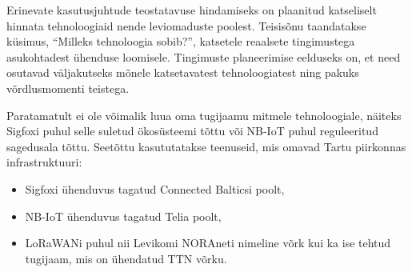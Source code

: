 \documentclass[12pt]{article}
\begin{document}
    Erinevate kasutusjuhtude teostatavuse hindamiseks on plaanitud katseliselt hinnata tehnoloogiaid nende leviomaduste poolest.
    Teisisõnu taandatakse küsimus, "`Milleks tehnoloogia sobib?"', katsetele reaalsete tingimustega asukohtadest ühenduse loomisele.
    Tingimuste planeerimise eelduseks on, et need osutavad väljakutseks mõnele katsetavatest tehnoloogiatest ning pakuks võrdlusmomenti teistega.

    Paratamatult ei ole võimalik luua oma tugijaamu mitmele tehnoloogiale, näiteks Sigfoxi puhul selle suletud ökosüsteemi tõttu või NB-IoT puhul reguleeritud sagedusala tõttu.
    Seetõttu kasututatakse teenuseid, mis omavad Tartu piirkonnas infrastruktuuri:
    \begin{itemize}
        \item Sigfoxi ühenduvus tagatud Connected Balticsi poolt,
        \item NB-IoT ühenduvus tagatud Telia poolt,
        \item LoRaWANi puhul nii Levikomi NORAneti nimeline võrk kui ka ise tehtud tugijaam, mis on ühendatud TTN võrku.
    \end{itemize}
\end{document}
